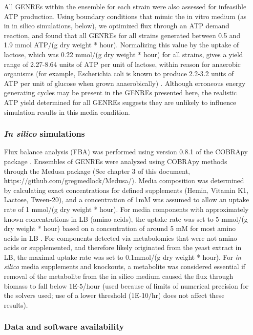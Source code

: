 \documentclass[11pt,twocolumn,notitlepage,openany,twoside]{book}
\begin{document}
\begin{refsection}
All GENREs within the ensemble for each strain were also assessed for infeasible ATP production. Using boundary conditions that mimic the in vitro medium (as in in silico simulations, below), we optimized flux through an ATP demand reaction, and found that all GENREs for all strains generated between 0.5 and 1.9 mmol ATP/(g dry weight * hour). Normalizing this value by the uptake of lactose, which was 0.22 mmol/(g dry weight * hour) for all strains, gives a yield range of 2.27-8.64 units of ATP per unit of lactose, within reason for anaerobic organisms (for example, Escherichia coli is known to produce 2.2-3.2 units of ATP per unit of glucose when grown anaerobically) \cite{Muir1985-ft}. Although erroneous energy generating cycles may be present in the GENREs presented here, the realistic ATP yield determined for all GENREs suggests they are unlikely to influence simulation results in this media condition.

\subsubsection{\textit{In silico} simulations}

Flux balance analysis (FBA) was performed using version 0.8.1 of the COBRApy package \cite{Ebrahim2013-eb}. Ensembles of GENREs were analyzed using COBRApy methods through the Medusa package (See chapter 3 of this document, https://github.com/gregmedlock/Medusa/). Media composition was determined by calculating exact concentrations for defined supplements (Hemin, Vitamin K1, Lactose, Tween-20), and a concentration of 1mM was assumed to allow an uptake rate of 1 mmol/(g dry weight * hour). For media components with approximately known concentrations in LB (amino acids), the uptake rate was set to 5 mmol/(g dry weight * hour) based on a concentration of around 5 mM for most amino acids in LB \cite{Sezonov2007-hp}. For components detected via metabolomics that were not amino acids or supplemented, and therefore likely originated from the yeast extract in LB, the maximal uptake rate was set to 0.1mmol/(g dry weight * hour). For \textit{in silico} media supplements and knockouts, a metabolite was considered essential if removal of the metabolite from the in silico medium caused the flux through biomass to fall below 1E-5/hour (used because of limits of numerical precision for the solvers used; use of a lower threshold (1E-10/hr) does not affect these results).

\subsubsection{Data and software availability}


\end{refsection}
\end{document}
